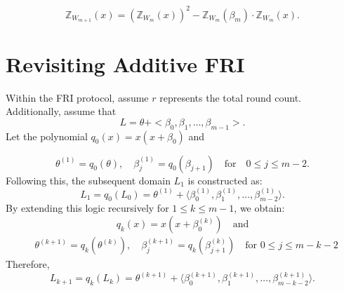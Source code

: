 \documentclass[11pt,runningheads]{llncs}
\begin{document}
\[\mathbb{Z}_{W_{m+1}}(x)= (\mathbb{Z}_{W_{m}}(x))^2- \mathbb{Z}_{W_{m}}(\beta_{m})\cdot \mathbb{Z}_{W_{m}}(x). \]







\section{Revisiting Additive FRI}
Within the FRI protocol, assume $r$ represents the total round count. Additionally, assume that 
\[L=\theta + <\beta_{0},\beta_{1}, \dots,\beta_{m-1}>.\]
Let the polynomial $q_0(x)=x(x+\beta_0)$ and 

\[ \theta^{(1)}=q_{0}(\theta),\quad \beta_{j}^{(1)}=q_{0}(\beta_{j+1}) \quad \text{for} \quad 0\le j\le m-2.\]
Following this, the subsequent domain $L_{1}$ is constructed as:
$$L_{1}=q_{0}(L_{0})=\theta^{(1)} + \langle\beta_{0}^{(1)},\beta_{1}^{(1)},\dots,\beta_{m-2}^{(1)}\rangle .$$
By extending this logic recursively for $1\le k\le m-1$, we obtain:
\[q_{k}(x)=x(x+\beta_{0}^{(k)}) \quad \text{and} \]
\begin{equation*}
    \begin{aligned}
    &\theta^{(k+1)}
    =q_{k}(\theta^{(k)}), \quad \beta_{j}^{(k+1)}
    =q_{k}(\beta_{j+1}^{(k)}) \quad \text{for } 0\le j\le m-k-2
    \end{aligned}
\end{equation*}
%
Therefore,
$$L_{k+1}=q_{k}(L_{k})=\theta^{(k+1)} + \langle\beta_{0}^{(k+1)},\beta_{1}^{(k+1)},\dots,\beta_{m-k-2}^{(k+1)}\rangle .$$
\end{document}
